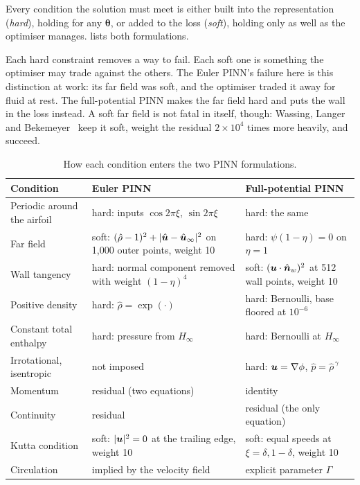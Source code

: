 Every condition the solution must meet is either built into the representation (\emph{hard}),
holding for any $\bm\theta$, or added to the loss (\emph{soft}), holding only as well as the
optimiser manages.  lists both formulations.

Each hard constraint removes a way to fail. Each soft one is something the optimiser may trade
against the others. The Euler PINN's failure here is this distinction at work: its far field was
soft, and the optimiser traded it away for fluid at rest. The full-potential PINN makes the far
field hard and puts the wall in the loss instead. A soft far field is not fatal in itself, though:
Wassing, Langer and Bekemeyer~\cite{wassing2025} keep it soft, weight the residual
$2\times10^4$ times more heavily, and succeed.

\begin{table}[t]
\centering\small
\caption{How each condition enters the two PINN formulations.}
\label{tab:constraints}
\begin{tabularx}{\textwidth}{@{}>{\raggedright\arraybackslash}p{}>{\raggedright\arraybackslash}X>{\raggedright\arraybackslash}X@{}}
\toprule
Condition & Euler PINN & Full-potential PINN\\
\midrule
Periodic around the airfoil & hard: inputs $\cos2\pi\xi$, $\sin2\pi\xi$ & hard: the same\\
Far field & soft: $(\hat\rho-1)^2 + |\hat{\bm{u}} - \hat{\bm{u}}_\infty|^2$ on 1,000 outer points, weight 10 & hard: $\psi(1-\eta) = 0$ on $\eta = 1$\\
Wall tangency & hard: normal component removed with weight $(1-\eta)^4$ & soft: $(\bm{u}\cdot\hat{\bm n}_w)^2$ at 512 wall points, weight 10\\
Positive density & hard: $\hat\rho = \exp(\cdot)$ & hard: Bernoulli, base floored at $10^{-6}$\\
Constant total enthalpy & hard: pressure from $H_\infty$ & hard: Bernoulli at $H_\infty$\\
Irrotational, isentropic & not imposed & hard: $\bm{u} = \nabla\phi$, $\hat p = \hat\rho^{\,\gamma}$\\
Momentum & residual (two equations) & identity\\
Continuity & residual & residual (the only equation)\\
Kutta condition & soft: $|\bm{u}|^2 = 0$ at the trailing edge, weight 10 & soft: equal speeds at $\xi = \delta, 1-\delta$, weight 10\\
Circulation & implied by the velocity field & explicit parameter $\Gamma$\\
\bottomrule
\end{tabularx}
\end{table}

